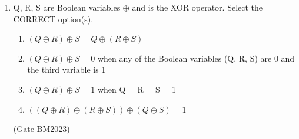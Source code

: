 \begin{enumerate}
\item Q, R, S are Boolean variables  $ \oplus$ and is the XOR operator. Select the CORRECT option(s).

\begin{enumerate}
\item $(Q  \oplus  R)  \oplus  S = Q  \oplus  (R  \oplus  S) $
\item $(Q  \oplus  R)  \oplus  S = 0$ when any of the Boolean variables (Q, R, S) are 0 and the third variable is 1
\item $(Q  \oplus  R)  \oplus  S = 1$ when Q = R = S = 1
\item $((Q  \oplus  R)  \oplus  (R  \oplus  S))  \oplus  (Q  \oplus  S) = 1$
\end{enumerate}
\hfill{(Gate BM2023)}

\end{enumerate}




